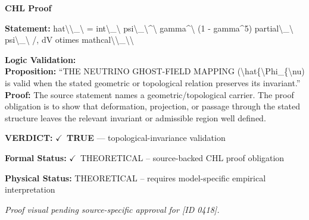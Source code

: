 \vspace{0.45em}
\noindent\textbf{CHL Proof}\par
\textbf{Statement:} hat\textbackslash{}\textbackslash{}\_\textbackslash{} = int\textbackslash{}\_\textbackslash{} psi\textbackslash{}\_\textbackslash{}\textasciicircum{}\textbackslash{} gamma\textasciicircum{}\textbackslash{} (1 - gamma\textasciicircum{}5) partial\textbackslash{}\_\textbackslash{} psi\textbackslash{}\_\textbackslash{} /, dV otimes
mathcal\textbackslash{}\textbackslash{}\_\textbackslash{}\textbackslash{}

\textbf{Logic Validation:}\\
\textbf{Proposition:} ``THE NEUTRINO GHOST-FIELD MAPPING (\textbackslash{}hat\{\textbackslash{}Phi\_\{\textbackslash{}nu) is valid when the stated geometric
or topological relation preserves its invariant.''\\
\textbf{Proof:} The source statement names a geometric/topological carrier. The proof obligation is to
show that deformation, projection, or passage through the stated structure leaves the
relevant invariant or admissible region well defined.

\textbf{VERDICT:} \ensuremath{\checkmark}\ \textbf{TRUE} --- topological-invariance validation

\textbf{Formal Status:} \ensuremath{\checkmark}\ THEORETICAL -- source-backed CHL proof obligation

\textbf{Physical Status:} THEORETICAL -- requires model-specific empirical interpretation
\par\vspace{0.45em}
\par
\vfill
\begingroup\footnotesize\itshape
Proof visual pending source-specific approval for [ID 0418].
\par\endgroup
\vfill
\endgroup
\endgroup
